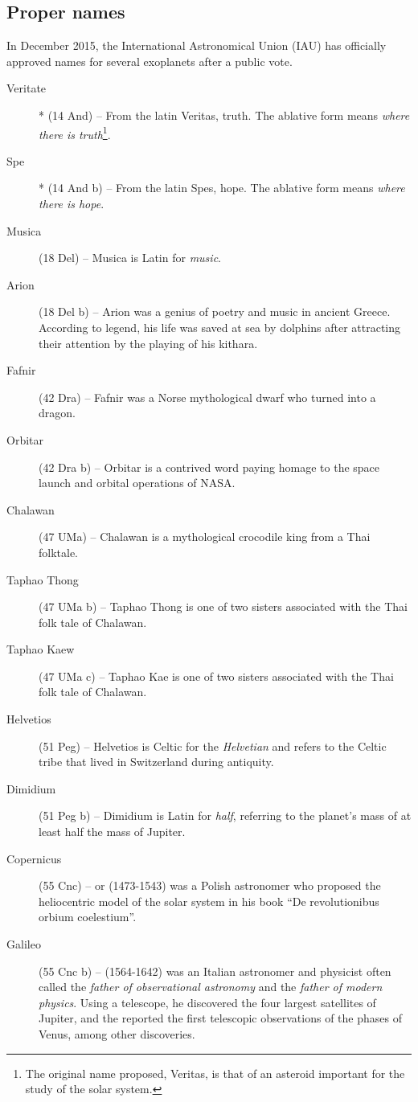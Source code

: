 \subsection{Proper names}
\label{sec:plugins:Exoplanets:ProperNames}
In December 2015, the International Astronomical Union (IAU) has officially approved names for several exoplanets after a public vote.
\begin{description}
\item[Veritate]* (14 And) -- From the latin Veritas, truth. The ablative form means \textit{where there is truth}\footnote{The original name proposed, Veritas, is that of an asteroid important for the study of the solar system.}.
\item[Spe]* (14 And b) -- From the latin Spes, hope. The ablative form means \textit{where there is hope}.
\item[Musica] (18 Del) -- Musica is Latin for \textit{music}.
\item[Arion] (18 Del b) -- Arion was a genius of poetry and music in ancient Greece. According to legend, his life was saved at sea by dolphins after attracting their attention by the playing of his kithara.
\item[Fafnir] (42 Dra) -- Fafnir was a Norse mythological dwarf who turned into a dragon.
\item[Orbitar] (42 Dra b) -- Orbitar is a contrived word paying homage to the space launch and orbital operations of NASA.
\item[Chalawan] (47 UMa) -- Chalawan is a mythological crocodile king from a Thai folktale.
\item[Taphao Thong] (47 UMa b) -- Taphao Thong is one of two sisters associated with the Thai folk tale of Chalawan.
\item[Taphao Kaew] (47 UMa c) -- Taphao Kae is one of two sisters associated with the Thai folk tale of Chalawan.
\item[Helvetios] (51 Peg) -- Helvetios is Celtic for the \textit{Helvetian} and refers to the Celtic tribe that lived in Switzerland during antiquity.
\item[Dimidium] (51 Peg b) -- Dimidium is Latin for \textit{half}, referring to the planet's mass of at least half the mass of Jupiter.
\item[Copernicus] (55 Cnc) --  or  (1473-1543) was a Polish astronomer who proposed the heliocentric model of the solar system in his book ``De revolutionibus orbium coelestium''.
\item[Galileo] (55 Cnc b) --  (1564-1642) was an Italian astronomer and physicist often called the \textit{father of observational astronomy} and the \textit{father of modern physics}. Using a telescope, he discovered the four largest satellites of Jupiter, and the reported the first telescopic observations of the phases of Venus, among other discoveries.

\end{description}
